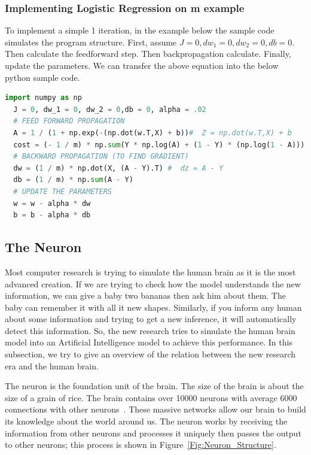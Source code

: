 \subsubsection{Implementing Logistic Regression on m example}
To implement a simple 1 iteration, in the example below the sample code simulates the program structure. First, assume $J = 0, dw_1 = 0, dw_2 = 0,db = 0$. Then calculate the feedforward step. Then backpropagation calculate. Finally, update the parameters. We can transfer the above equation into the below python sample code.%
 \begin{lstlisting}[language=Python]
  import numpy as np
  J = 0, dw_1 = 0, dw_2 = 0,db = 0, alpha = .02
  # FEED FORWARD PROPAGATION
  A = 1 / (1 + np.exp(-(np.dot(w.T,X) + b))#  Z = np.dot(w.T,X) + b
  cost = (- 1 / m) * np.sum(Y * np.log(A) + (1 - Y) * (np.log(1 - A)))
  # BACKWARD PROPAGATION (TO FIND GRADIENT)
  dw = (1 / m) * np.dot(X, (A - Y).T) #  dz = A - Y
  db = (1 / m) * np.sum(A - Y)
  # UPDATE THE PARAMETERS
  w = w - alpha * dw
  b = b - alpha * db
 \end{lstlisting}%
%
\subsection{The Neuron}

Most computer research is trying to simulate the human brain as it is the most advanced creation. If we are trying to check how the model understands the new information, we can give a baby two bananas then ask him about them. The baby can remember it with all it new shapes. Similarly, if you inform any human about some information and trying to get a new inference, it will automatically detect this information. So, the new research tries to simulate the human brain model into an Artificial Intelligence model to achieve this performance. In this subsection, we try to give an overview of the relation between the new research era and the human brain.
 
The neuron is the foundation unit of the brain. The size of the brain is about the size of a grain of rice. The brain contains over 10000 neurons with average 6000 connections with other neurons~\cite{Restak_2001}.  These massive networks allow our brain to build its knowledge about the world around us. The neuron works by receiving the information from other neurons and processes it uniquely then passes the output to other neurons; this process is shown in Figure~\ref{Fig:Neuron_Structure}.%


